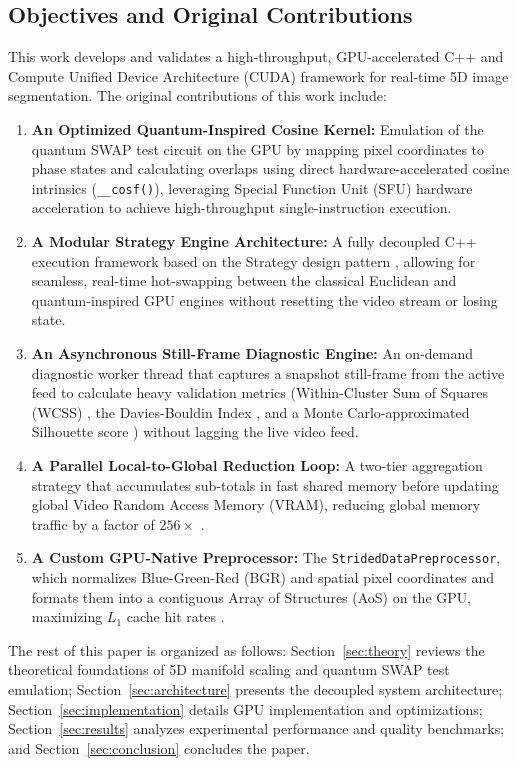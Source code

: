 \subsection{Objectives and Original Contributions}
This work develops and validates a high-throughput, GPU-accelerated C++ and Compute Unified Device Architecture (CUDA) framework for real-time 5D image segmentation. The original contributions of this work include:
\begin{enumerate}
    \item \textbf{An Optimized Quantum-Inspired Cosine Kernel:} Emulation of the quantum SWAP test circuit \cite{buhrman2001quantum} on the GPU by mapping pixel coordinates to phase states and calculating overlaps using direct hardware-accelerated cosine intrinsics (\texttt{\_\_cosf()}), leveraging Special Function Unit (SFU) hardware acceleration \cite{CudaGuide} to achieve high-throughput single-instruction execution.
    \item \textbf{A Modular Strategy Engine Architecture:} A fully decoupled C++ execution framework based on the Strategy design pattern \cite{gamma1995design}, allowing for seamless, real-time hot-swapping between the classical Euclidean and quantum-inspired GPU engines without resetting the video stream or losing state.
    \item \textbf{An Asynchronous Still-Frame Diagnostic Engine:} An on-demand diagnostic worker thread that captures a snapshot still-frame from the active feed to calculate heavy validation metrics (Within-Cluster Sum of Squares (WCSS) \cite{krzanowski1988criterion}, the Davies-Bouldin Index \cite{davies1979cluster}, and a Monte Carlo-approximated Silhouette score \cite{rousseeuw1987silhouettes}) without lagging the live video feed.
    \item \textbf{A Parallel Local-to-Global Reduction Loop:} A two-tier aggregation strategy that accumulates sub-totals in fast shared memory before updating global Video Random Access Memory (VRAM), reducing global memory traffic by a factor of $256\times$ \cite{CudaGuide}.
    \item \textbf{A Custom GPU-Native Preprocessor:} The \texttt{StridedDataPreprocessor}, which normalizes Blue-Green-Red (BGR) and spatial pixel coordinates and formats them into a contiguous Array of Structures (AoS) on the GPU, maximizing $L_1$ cache hit rates \cite{CudaGuide}.
\end{enumerate}

The rest of this paper is organized as follows: Section~\ref{sec:theory} reviews the theoretical foundations of 5D manifold scaling and quantum SWAP test emulation; Section~\ref{sec:architecture} presents the decoupled system architecture; Section~\ref{sec:implementation} details GPU implementation and optimizations; Section~\ref{sec:results} analyzes experimental performance and quality benchmarks; and Section~\ref{sec:conclusion} concludes the paper.
